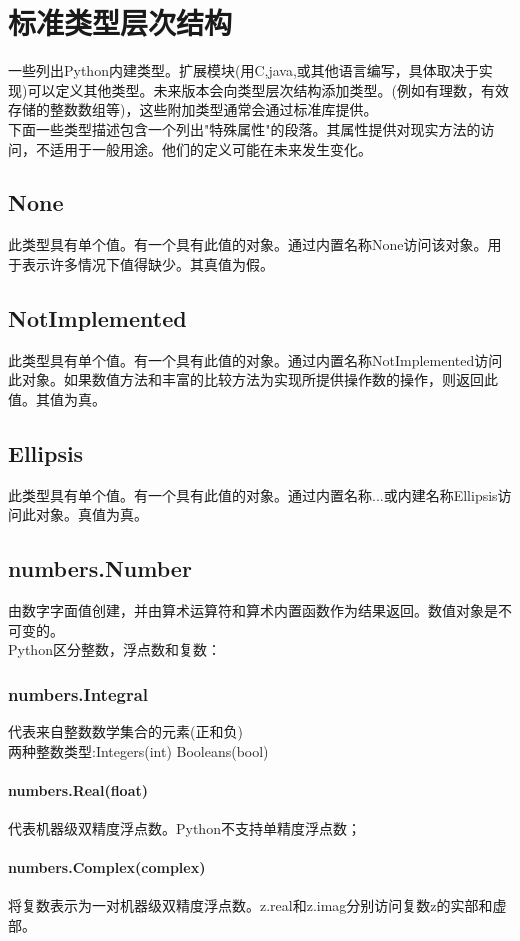 \documentclass[10pt,UTF8]{ctexart}
\begin{document}
\section{标准类型层次结构}
一些列出Python内建类型。扩展模块(用C,java,或其他语言编写，具体取决于实现)可以定义其他类型。未来版本会向类型层次结构添加类型。(例如有理数，有效存储的整数数组等)，这些附加类型通常会通过标准库提供。\\
\indent 下面一些类型描述包含一个列出"特殊属性"的段落。其属性提供对现实方法的访问，不适用于一般用途。他们的定义可能在未来发生变化。\\
\begin{flushleft}
\subsection{None}
此类型具有单个值。有一个具有此值的对象。通过内置名称None访问该对象。用于表示许多情况下值得缺少。其真值为假。
\subsection{NotImplemented}
此类型具有单个值。有一个具有此值的对象。通过内置名称NotImplemented访问此对象。如果数值方法和丰富的比较方法为实现所提供操作数的操作，则返回此值。其值为真。
\subsection{Ellipsis}
此类型具有单个值。有一个具有此值的对象。通过内置名称...或内建名称Ellipsis访问此对象。真值为真。
\subsection{numbers.Number}
由数字字面值创建，并由算术运算符和算术内置函数作为结果返回。数值对象是不可变的。\\
\indent Python区分整数，浮点数和复数：
\subsubsection{numbers.Integral} 代表来自整数数学集合的元素(正和负)\\
\indent 两种整数类型:Integers(int) Booleans(bool)
\paragraph{numbers.Real(float)}
代表机器级双精度浮点数。Python不支持单精度浮点数；
\paragraph{numbers.Complex(complex)}
将复数表示为一对机器级双精度浮点数。z.real和z.imag分别访问复数z的实部和虚部。

\end{flushleft}
\end{document}
